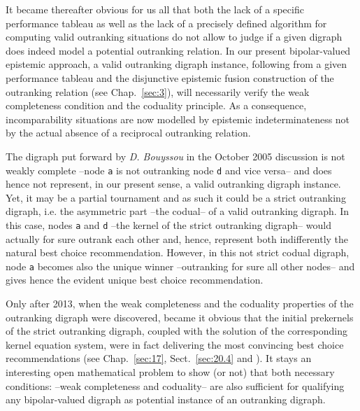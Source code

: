 It became thereafter obvious for us all that both the lack of a specific performance tableau as well as the lack of a precisely defined algorithm for computing valid outranking situations do not allow to judge if a given digraph does indeed model a potential outranking relation. In our present bipolar-valued epistemic approach, a valid outranking digraph instance, following from a given performance tableau and the disjunctive epistemic fusion construction of the outranking relation (see Chap.~\ref{sec:3}), will necessarily verify the weak completeness condition and the coduality principle. As a consequence, incomparability situations are now modelled by epistemic indeterminateness not by the actual absence of a reciprocal outranking relation.

The digraph put forward by \emph{D. Bouyssou} in the October 2005 discussion is not weakly complete --node \texttt{a} is not outranking node \texttt{d} and vice versa-- and does hence not represent, in our present sense, a valid outranking digraph instance. Yet, it may be a partial tournament and as such it could be a strict outranking digraph, i.e. the asymmetric part --the codual-- of a valid outranking digraph. In this case, nodes \texttt{a} and \texttt{d} --the kernel of the strict outranking digraph-- would actually for sure outrank each other and, hence, represent both indifferently the natural best choice recommendation. However, in this not strict codual digraph, node \texttt{a} becomes also the unique \Condorcet winner --outranking for sure all other nodes-- and gives hence the evident unique best choice recommendation.

Only after 2013, when the weak completeness and the coduality properties of the outranking digraph were discovered, became it obvious that the initial prekernels of the strict outranking digraph, coupled with the solution of the corresponding kernel equation system, were in fact delivering the most convincing best choice recommendations (see Chap.~\ref{sec:17}, Sect.~\ref{sec:20.4} and \citealp{BIS-2013}). It stays an interesting open mathematical problem to show (or not) that both necessary conditions: --weak completeness and coduality-- are also sufficient for qualifying any bipolar-valued digraph as potential instance of an outranking digraph.



%
%
